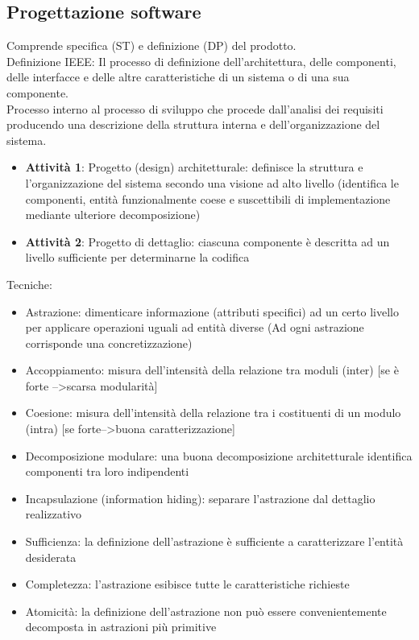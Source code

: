\subsection{Progettazione software}
Comprende specifica (ST) e definizione (DP) del prodotto.\\
Definizione IEEE: Il processo di definizione dell'architettura, delle componenti, delle interfacce e delle altre caratteristiche di un sistema o di una sua componente.\\
Processo interno al processo di sviluppo che procede dall'analisi dei requisiti producendo una descrizione della struttura interna e dell'organizzazione del sistema.\\
\begin{itemize}
\item \textbf{Attività 1}: Progetto (design) architetturale: definisce la struttura e l'organizzazione del sistema secondo una visione ad alto livello (identifica le componenti, entità funzionalmente coese e suscettibili di implementazione mediante ulteriore decomposizione)
\item \textbf{Attività 2}: Progetto di dettaglio: ciascuna componente è descritta ad un livello sufficiente per determinarne la codifica
\end{itemize}

Tecniche:
\begin{itemize}
\item Astrazione: dimenticare informazione (attributi specifici) ad un certo livello per applicare operazioni uguali ad entità diverse (Ad ogni astrazione corrisponde una concretizzazione)
\item Accoppiamento: misura dell'intensità della relazione tra moduli (inter) [se è forte -->scarsa modularità]
\item Coesione: misura dell'intensità della relazione tra i costituenti di un modulo (intra) [se forte-->buona caratterizzazione]
\item Decomposizione modulare: una buona decomposizione architetturale identifica componenti tra loro indipendenti
\item Incapsulazione (information hiding): separare l'astrazione dal dettaglio realizzativo
\item Sufficienza: la definizione dell'astrazione è sufficiente a caratterizzare l'entità desiderata
\item Completezza: l'astrazione esibisce tutte le caratteristiche richieste
\item Atomicità: la definizione dell'astrazione non può essere convenientemente decomposta in astrazioni più primitive
\end{itemize}

